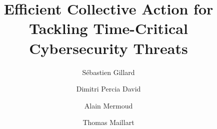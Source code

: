 \documentclass[unnumsec,webpdf,contemporary,large]{oup-authoring-template}%
\theoremstyle{thmstyleone}%
\theoremstyle{thmstyletwo}%
\theoremstyle{thmstylethree}%
\begin{document}



\title[Collective Action in Cybersecurity]{Efficient Collective Action for Tackling Time-Critical Cybersecurity Threats}

\author[1,2,$\ast$]{S\'ebastien Gillard }
\author[1,3,4]{Dimitri Percia David }
\author[3]{Alain Mermoud }
\author[1,5]{Thomas Maillart }


\address[1]{Information Science Institute, Geneva School of Economics and Management, University of Geneva}
\address[2]{Department of Defense Economics, Military Academy at ETH Zurich}
\address[3]{Cyber-Defence Campus, armasuisse Science and Technology}
\address[4]{Institute of Entrepreneurship \& Management, School of Management, University of Applied Sciences of Western Switzerland (HES-SO Valais-Wallis)}
\address[5]{Citizen Cyber Lab, University of Geneva}





\end{document}
